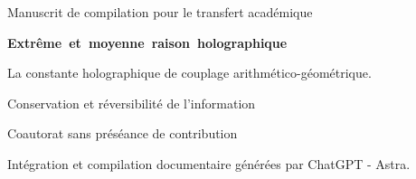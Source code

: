 \thispagestyle{plain}
\begin{center}
{\fontsize{10}{12}\selectfont Manuscrit de compilation pour le transfert académique\par}
\vspace{2mm}
{\fontsize{17}{20.5}\selectfont\bfseries\mbox{Extrême et moyenne raison holographique}\par}
\vspace{2mm}
{\fontsize{11}{13.5}\selectfont
La constante holographique de couplage arithmético-géométrique.\par
Conservation et réversibilité de l’information\par}
\vspace{2mm}
{\fontsize{11.5}{14}\selectfont\Autores\par}
\vspace{2mm}
{\fontsize{8}{10}\selectfont Coautorat sans préséance de contribution\par
Intégration et compilation documentaire générées par ChatGPT - Astra.\par}
\end{center}
\vspace{2mm}
